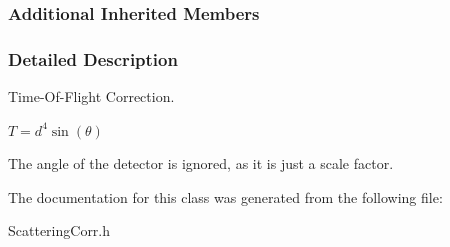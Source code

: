 \subsubsection*{Additional Inherited Members}


\subsubsection{Detailed Description}
Time-\/\+Of-\/\+Flight Correction. 

$ T = d^4\sin(\theta) $

The  angle of the detector is ignored, as it is just a scale factor. 

The documentation for this class was generated from the following file\+:\begin{DoxyCompactItemize}
\item 
Scattering\+Corr.\+h\end{DoxyCompactItemize}
